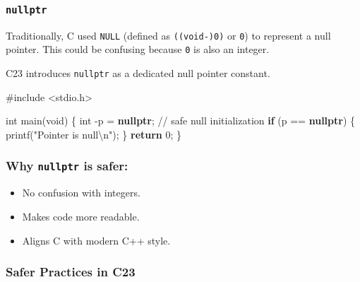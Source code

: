 \documentclass[
  letterpaper,
  DIV=11,
  numbers=noendperiod]{scrreprt}
\newenvironment{Shaded}{\begin{snugshade}}{\end{snugshade}}
\newcommand{\CommentTok}[1]{\textcolor[rgb]{0.37,0.37,0.37}{#1}}
\newcommand{\ControlFlowTok}[1]{\textcolor[rgb]{0.00,0.23,0.31}{\textbf{#1}}}
\newcommand{\DataTypeTok}[1]{\textcolor[rgb]{0.68,0.00,0.00}{#1}}
\newcommand{\DecValTok}[1]{\textcolor[rgb]{0.68,0.00,0.00}{#1}}
\newcommand{\ImportTok}[1]{\textcolor[rgb]{0.00,0.46,0.62}{#1}}
\newcommand{\KeywordTok}[1]{\textcolor[rgb]{0.00,0.23,0.31}{\textbf{#1}}}
\newcommand{\NormalTok}[1]{\textcolor[rgb]{0.00,0.23,0.31}{#1}}
\newcommand{\OperatorTok}[1]{\textcolor[rgb]{0.37,0.37,0.37}{#1}}
\newcommand{\PreprocessorTok}[1]{\textcolor[rgb]{0.68,0.00,0.00}{#1}}
\newcommand{\SpecialCharTok}[1]{\textcolor[rgb]{0.37,0.37,0.37}{#1}}
\newcommand{\StringTok}[1]{\textcolor[rgb]{0.13,0.47,0.30}{#1}}
\providecommand{\tightlist}{%
  \setlength{\itemsep}{0pt}\setlength{\parskip}{0pt}}
\begin{document}
\subsubsection{\texorpdfstring{\texttt{nullptr}}{nullptr}}\label{nullptr}

Traditionally, C used \texttt{NULL} (defined as \texttt{((void-)0)} or
\texttt{0}) to represent a null pointer. This could be confusing because
\texttt{0} is also an integer.

C23 introduces \texttt{nullptr} as a dedicated null pointer constant.

\begin{Shaded}
\begin{Highlighting}[]
\PreprocessorTok{\#include }\ImportTok{\textless{}stdio.h\textgreater{}}

\DataTypeTok{int}\NormalTok{ main}\OperatorTok{(}\DataTypeTok{void}\OperatorTok{)} \OperatorTok{\{}
    \DataTypeTok{int} \OperatorTok{{-}}\NormalTok{p }\OperatorTok{=} \KeywordTok{nullptr}\OperatorTok{;}  \CommentTok{// safe null initialization}
    \ControlFlowTok{if} \OperatorTok{(}\NormalTok{p }\OperatorTok{==} \KeywordTok{nullptr}\OperatorTok{)} \OperatorTok{\{}
\NormalTok{        printf}\OperatorTok{(}\StringTok{"Pointer is null}\SpecialCharTok{\textbackslash{}n}\StringTok{"}\OperatorTok{);}
    \OperatorTok{\}}
    \ControlFlowTok{return} \DecValTok{0}\OperatorTok{;}
\OperatorTok{\}}
\end{Highlighting}
\end{Shaded}

\subsubsection{\texorpdfstring{Why \texttt{nullptr} is
safer:}{Why nullptr is safer:}}\label{why-nullptr-is-safer}

\begin{itemize}
\tightlist
\item
  No confusion with integers.
\item
  Makes code more readable.
\item
  Aligns C with modern C++ style.
\end{itemize}

\subsubsection{Safer Practices in C23}\label{safer-practices-in-c23}
\end{document}

